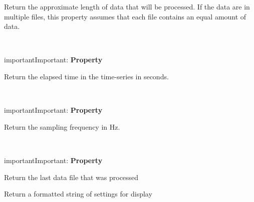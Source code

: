 \documentclass[letterpaper,10pt,english]{sphinxmanual}
\begin{document}
\begin{fulllineitems}
\begin{fulllineitems}
Return the approximate length of data that will be processed. If the data are in multiple files,
this property assumes that each file contains an equal amount of data.

\end{fulllineitems}


\begin{fulllineitems}
\label{api-doc/mosaic.meta:mosaic.metaTrajIO.metaTrajIO.ElapsedTimeSeconds}~
\begin{notice}{important}{Important:}
\textbf{Property}
\end{notice}

Return the elapsed time in the time-series in seconds.

\end{fulllineitems}


\begin{fulllineitems}
\label{api-doc/mosaic.meta:mosaic.metaTrajIO.metaTrajIO.FsHz}~
\begin{notice}{important}{Important:}
\textbf{Property}
\end{notice}

Return the sampling frequency in Hz.

\end{fulllineitems}


\begin{fulllineitems}
\label{api-doc/mosaic.meta:mosaic.metaTrajIO.metaTrajIO.LastFileProcessed}~
\begin{notice}{important}{Important:}
\textbf{Property}
\end{notice}

Return the last data file that was processed

\end{fulllineitems}


\begin{fulllineitems}
\label{api-doc/mosaic.meta:mosaic.metaTrajIO.metaTrajIO.formatsettings}
Return a formatted string of settings for display


\end{fulllineitems}
\end{fulllineitems}
\end{document}
